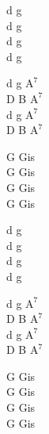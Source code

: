 \begin{chord}
    d g\\
    d g\\
    d g\\
    d g

    d g $\mathrm{A^7}$\\
    D B $\mathrm{A^7}$\\
    d g $\mathrm{A^7}$\\
    D B $\mathrm{A^7}$

    G Gis\\
    G Gis\\
    G Gis\\
    G Gis

    d g\\
    d g\\
    d g\\
    d g

    d g $\mathrm{A^7}$\\
    D B $\mathrm{A^7}$\\
    d g $\mathrm{A^7}$\\
    D B $\mathrm{A^7}$

    G Gis\\
    G Gis\\
    G Gis\\
    G Gis
\end{chord}
